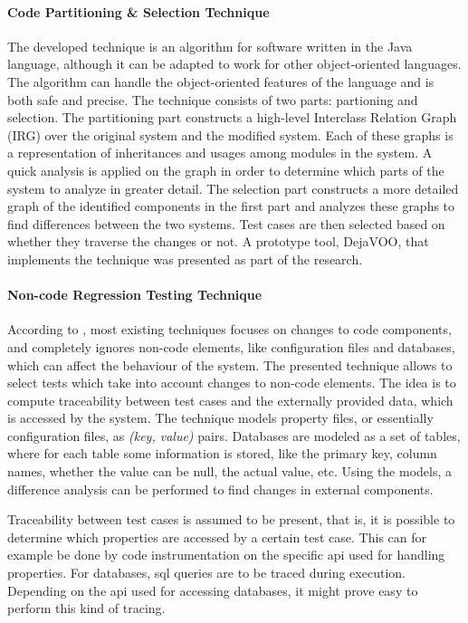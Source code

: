 \documentclass[a4paper,english,12pt]{report}
\begin{document}
\paragraph{Code Partitioning \& Selection Technique \citep{orso2004scaling}}
The developed technique is an algorithm for software written in the Java language, although it can be adapted to work for other object-oriented languages. The algorithm can handle the object-oriented features of the language and is both safe and precise. The technique consists of two parts: partioning and selection. The partitioning part constructs a high-level Interclass Relation Graph (IRG) over the original system and the modified system. Each of these graphs is a representation of inheritances and usages among modules in the system. A quick analysis is applied on the graph in order to determine which parts of the system to analyze in greater detail. The selection part constructs a more detailed graph of the identified components in the first part and analyzes these graphs to find differences between the two systems. Test cases are then selected based on whether they traverse the changes or not. A prototype tool, DejaVOO, that implements the technique was presented as part of the research. \citep{orso2004scaling}

\paragraph{Non-code Regression Testing Technique \citep{nanda2011regression}}
According to \citet{nanda2011regression}, most existing techniques focuses on changes to code components, and completely ignores non-code elements, like configuration files and databases, which can affect the behaviour of the system. The presented technique allows to select tests which take into account changes to non-code elements. The idea is to compute traceability between test cases and the externally provided data, which is accessed by the system. The technique models property files, or essentially configuration files, as \textit{(key, value)} pairs. Databases are modeled as a set of tables, where for each table some information is stored, like the primary key, column names, whether the value can be null, the actual value, etc. Using the models, a difference analysis can be performed to find changes in external components. \citep{nanda2011regression}

Traceability between test cases is assumed to be present, that is, it is possible to determine which properties are accessed by a certain test case. This can for example be done by code instrumentation on the specific \gls{api} used for handling properties. For databases, \gls{sql} queries are to be traced during execution. Depending on the \gls{api} used for accessing databases, it might prove easy to perform this kind of tracing. \citep{nanda2011regression}
\end{document}
